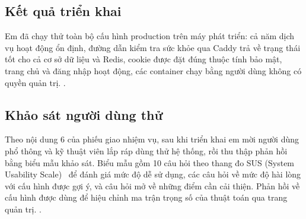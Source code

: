 \subsection{Kết quả triển khai}

Em đã chạy thử toàn bộ cấu hình production trên máy phát triển: cả năm dịch vụ hoạt động ổn định, đường dẫn kiểm tra sức khỏe qua Caddy trả về trạng thái tốt cho cả cơ sở dữ liệu và Redis, cookie được đặt đúng thuộc tính bảo mật, trang chủ và đăng nhập hoạt động, các container chạy bằng người dùng không có quyền quản trị. .

\subsection{Khảo sát người dùng thử}

Theo nội dung 6 của phiếu giao nhiệm vụ, sau khi triển khai em mời người dùng phổ thông và kỹ thuật viên lắp ráp dùng thử hệ thống, rồi thu thập phản hồi bằng biểu mẫu khảo sát. Biểu mẫu gồm 10 câu hỏi theo thang đo SUS (System Usability Scale)~\cite{sus} để đánh giá mức độ dễ sử dụng, các câu hỏi về mức độ hài lòng với cấu hình được gợi ý, và câu hỏi mở về những điểm cần cải thiện. Phản hồi về cấu hình được dùng để hiệu chỉnh ma trận trọng số của thuật toán qua trang quản trị. .

